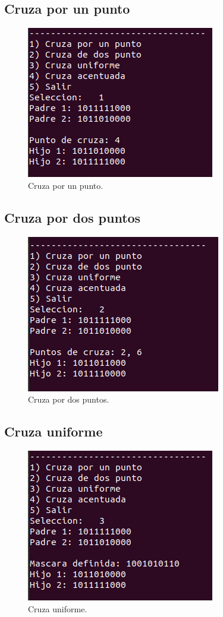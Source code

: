 \documentclass[11pt,letterpaper]{article}
\begin{document}
\subsection*{Cruza por un punto}

\begin{figure}[H]
	\centering
	\includegraphics[scale = 1]{images/cruzaUnPunto}
	\caption{Cruza por un punto.}
\end{figure}

\subsection*{Cruza por dos puntos}

\begin{figure}[H]
	\centering
	\includegraphics[scale = 1]{images/cruzaDosPuntos}
	\caption{Cruza por dos puntos.}
\end{figure}

\subsection*{Cruza uniforme}

\begin{figure}[H]
	\centering
	\includegraphics[scale = 1]{images/uniforme}
	\caption{Cruza uniforme.}
\end{figure}
\end{document}

